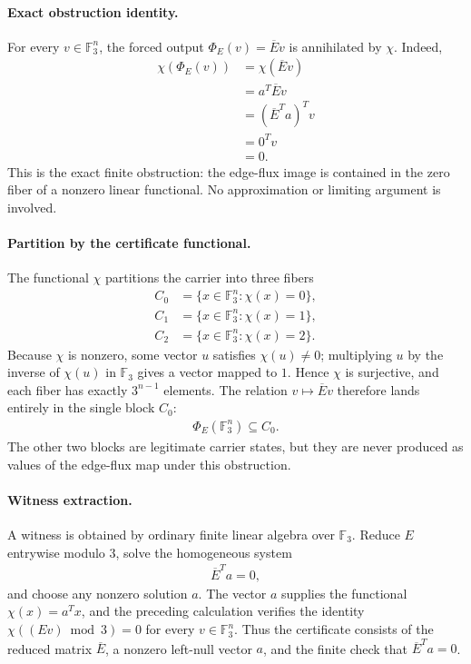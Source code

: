 \paragraph{Exact obstruction identity.}
For every $v\in\mathbb{F}_3^n$, the forced output $\Phi_E(v)=\overline E v$ is annihilated by $\chi$. Indeed,
$$
\begin{aligned}
\chi(\Phi_E(v))
&=\chi(\overline E v)\\
&=a^T\overline E v\\
&=(\overline E^T a)^T v\\
&=0^T v\\
&=0.
\end{aligned}
$$
This is the exact finite obstruction: the edge-flux image is contained in the zero fiber of a nonzero linear functional. No approximation or limiting argument is involved.

\paragraph{Partition by the certificate functional.}
The functional $\chi$ partitions the carrier into three fibers
$$
\begin{aligned}
C_0&=\{x\in\mathbb{F}_3^n:\chi(x)=0\},\\
C_1&=\{x\in\mathbb{F}_3^n:\chi(x)=1\},\\
C_2&=\{x\in\mathbb{F}_3^n:\chi(x)=2\}.
\end{aligned}
$$
Because $\chi$ is nonzero, some vector $u$ satisfies $\chi(u)\neq 0$; multiplying $u$ by the inverse of $\chi(u)$ in $\mathbb{F}_3$ gives a vector mapped to $1$. Hence $\chi$ is surjective, and each fiber has exactly $3^{n-1}$ elements. The relation $v\mapsto\overline E v$ therefore lands entirely in the single block $C_0$:
$$
\begin{aligned}
\Phi_E(\mathbb{F}_3^n)\subseteq C_0.
\end{aligned}
$$
The other two blocks are legitimate carrier states, but they are never produced as values of the edge-flux map under this obstruction.

\paragraph{Witness extraction.}
A witness is obtained by ordinary finite linear algebra over $\mathbb{F}_3$. Reduce $E$ entrywise modulo $3$, solve the homogeneous system
$$
\begin{aligned}
\overline E^T a=0,
\end{aligned}
$$
and choose any nonzero solution $a$. The vector $a$ supplies the functional $\chi(x)=a^T x$, and the preceding calculation verifies the identity $\chi((Ev)\bmod 3)=0$ for every $v\in\mathbb{F}_3^n$. Thus the certificate consists of the reduced matrix $\overline E$, a nonzero left-null vector $a$, and the finite check that $\overline E^T a=0$.

